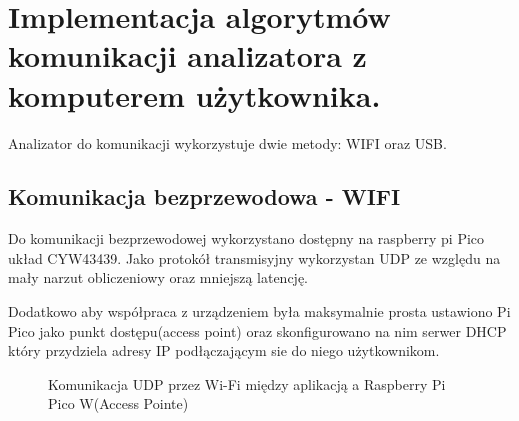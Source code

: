 \section{Implementacja algorytmów komunikacji analizatora z komputerem użytkownika.}
Analizator do komunikacji wykorzystuje dwie metody: WIFI oraz USB.   

\subsection{Komunikacja bezprzewodowa - WIFI}

\indent Do komunikacji bezprzewodowej wykorzystano dostępny na raspberry pi Pico
układ CYW43439. Jako protokół transmisyjny wykorzystan UDP ze względu na mały narzut
obliczeniowy oraz mniejszą latencję. 

\indent Dodatkowo aby współpraca z urządzeniem była maksymalnie prosta ustawiono Pi Pico
jako punkt dostępu(access point) oraz skonfigurowano na nim serwer DHCP który przydziela adresy
IP podłączającym sie do niego użytkownikom.


\begin{figure}[ht]
    \centering
    \caption{Komunikacja UDP przez Wi-Fi między aplikacją a Raspberry Pi Pico W(Access Pointe)}
    \label{fig:udp-komunikacja}
    \end{figure}



